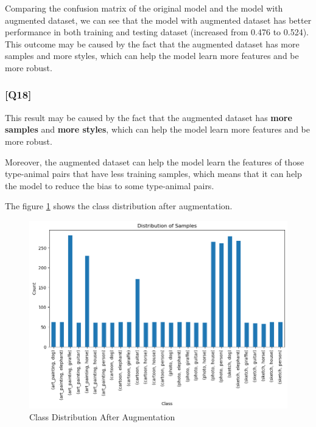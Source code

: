 \documentclass{article}
\begin{document}
Comparing the confusion matrix of the original model and the model with augmented dataset, 
we can see that the model with augmented dataset has better performance in both training and testing dataset (increased from 0.476 to 0.524).
This outcome may be caused by the fact that the augmented dataset has more samples and more styles, which can help the model learn more features and be more robust.

\subsubsection*{[Q18]}
This result may be caused by the fact that the augmented dataset has \textbf{more samples} and \textbf{more styles},
which can help the model learn more features and be more robust.

Moreover, the augmented dataset can help the model learn the features of those type-animal pairs that have less training samples,
which means that it can help the model to reduce the bias to some type-animal pairs.

The figure \ref{fig:class_distribution_aug} shows the class distribution after augmentation.

\begin{figure}[!ht]
    \centering
    \includegraphics[width=\textwidth]{./pic/class_distribution_3041.png}
    \caption{Class Distribution After Augmentation}
    \label{fig:class_distribution_aug}
\end{figure}
\end{document}
